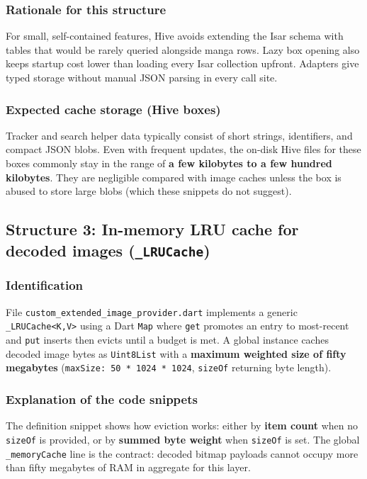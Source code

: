 \subsubsection*{Rationale for this structure}
For small, self-contained features, Hive avoids extending the Isar schema with tables that would be rarely queried alongside manga rows. Lazy box opening also keeps startup cost lower than loading every Isar collection upfront. Adapters give typed storage without manual JSON parsing in every call site.

\subsubsection*{Expected cache storage (Hive boxes)}
Tracker and search helper data typically consist of short strings, identifiers, and compact JSON blobs. Even with frequent updates, the on-disk Hive files for these boxes commonly stay in the range of \textbf{a few kilobytes to a few hundred kilobytes}. They are negligible compared with image caches unless the box is abused to store large blobs (which these snippets do not suggest).


\subsection{Structure 3: In-memory LRU cache for decoded images (\texttt{\_LRUCache})}

\subsubsection*{Identification}
File \texttt{custom\_extended\_image\_provider.dart} implements a generic \texttt{\_LRUCache<K,V>} using a Dart \texttt{Map} where \texttt{get} promotes an entry to most-recent and \texttt{put} inserts then evicts until a budget is met. A global instance caches decoded image bytes as \texttt{Uint8List} with a \textbf{maximum weighted size of fifty megabytes} (\texttt{maxSize: 50 * 1024 * 1024}, \texttt{sizeOf} returning byte length).

\subsubsection*{Explanation of the code snippets}
The definition snippet shows how eviction works: either by \textbf{item count} when no \texttt{sizeOf} is provided, or by \textbf{summed byte weight} when \texttt{sizeOf} is set. The global \texttt{\_memoryCache} line is the contract: decoded bitmap payloads cannot occupy more than fifty megabytes of RAM in aggregate for this layer.

